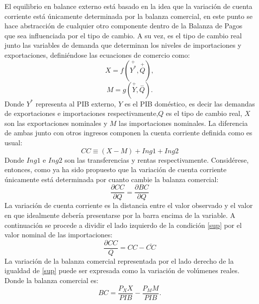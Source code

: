 \documentclass[12pt,letterpaper]{article}
\begin{document}
El equilibrio en balance externo está basado en la idea que la variación de cuenta corriente está únicamente determinada por la balanza comercial, en este punto se hace abstracción de cualquier otro componente dentro de la Balanza de Pagos que sea influenciada por el tipo de cambio. A su vez, es el tipo de cambio real junto las variables de demanda que determinan los niveles de importaciones y exportaciones, definiéndose las ecuaciones de comercio como:
\begin{equation}\label{X}
X=f(\overset{+}{Y^*},\overset{+}{Q}),
\end{equation}
\begin{equation}\label{M}
M=g(\overset{+}{Y},\overset{-}{Q}).
\end{equation}
Donde $Y^*$ representa al PIB externo, $Y$ es el PIB doméstico, es decir las demandas de exportaciones e importaciones respectivamente,$Q$ es el tipo de cambio real, $X$ son las exportaciones nominales y $M$ las importaciones nominales.
La diferencia de ambas junto con otros ingresos componen la cuenta corriente definida como es usual:
\begin{equation}\label{CC}
CC\equiv(X-M)+Ing1+Ing2
\end{equation}
Donde $Ing1$ e $Ing2$ son las transferencias y rentas respectivamente.
Considérese, entonces, como ya ha sido propuesto que la variación de cuenta corriente únicamente está determinada por cuanto cambie la balanza comercial:
\begin{equation}\label{sup}
\frac{\partial CC}{\partial Q}=\frac{\partial BC}{\partial Q}
\end{equation}
La variación de cuenta corriente es la distancia entre el valor observado y el valor en que idealmente debería presentarse por la barra encima de la variable. A continuación se procede a dividir el lado izquierdo de la condición \ref{sup} por el valor nominal de las importaciones:
\begin{equation}\label{dcc}
\frac{\partial CC}{Q}=CC-\bar{CC}
\end{equation}
La variación de la balanza comercial representada por el lado derecho de la igualdad de \ref{sup} puede ser expresada como la variación de volúmenes reales. Donde la balanza comercial es:
\begin{equation}
BC=\frac{P_X X}{PIB}-\frac{P_M M}{PIB}.
\end{equation}
\end{document}
